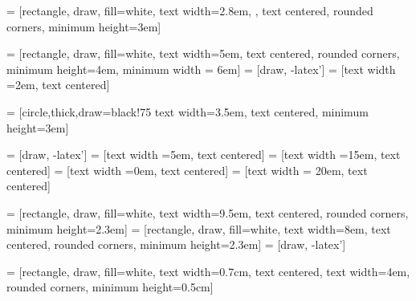 
 = [rectangle, draw, fill=white, text width=2.8em,
, text
centered, rounded corners, minimum height=3em]


 =
[rectangle, draw, fill=white, text width=5em, text centered, rounded
corners, minimum height=4em, minimum width = 6em]  = [draw, -latex']
 = [text width =2em, text centered]




 = [circle,thick,draw=black!75   text width=3.5em, text
centered, minimum height=3em]



 = [draw, -latex']
 = [text width =5em, text centered]
 = [text width =15em, text centered]
 = [text width =0em, text centered]
 = [text width = 20em, text centered]



 =
[rectangle, draw, fill=white, text width=9.5em, text centered, rounded
corners, minimum height=2.3em]
 =
[rectangle, draw, fill=white, text width=8em, text centered, rounded
corners, minimum height=2.3em]  = [draw, -latex']


 = [rectangle, draw, fill=white, text width=0.7cm, text
centered,  text width=4em, rounded corners, minimum height=0.5cm]
















%
%
%
%
